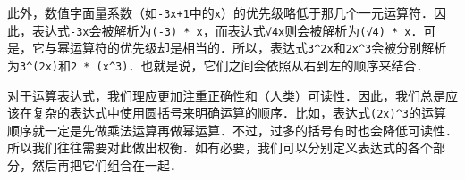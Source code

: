 此外，数值字面量系数（如\verb|-3x+1|中的\verb|x|）的优先级略低于那几个一元运算符．因此，表达式\verb|-3x|会被解析为\verb|(-3) * x|，而表达式\verb|√4x|则会被解析为\verb|(√4) * x|．可是，它与幂运算符的优先级却是相当的．所以，表达式\verb|3^2x|和\verb|2x^3|会被分别解析为\verb|3^(2x)|和\verb|2 * (x^3)|．也就是说，它们之间会依照从右到左的顺序来结合．

对于运算表达式，我们理应更加注重正确性和（人类）可读性．因此，我们总是应该在复杂的表达式中使用圆括号来明确运算的顺序．比如，表达式\verb|(2x)^3|的运算顺序就一定是先做乘法运算再做幂运算．不过，过多的括号有时也会降低可读性．所以我们往往需要对此做出权衡．如有必要，我们可以分别定义表达式的各个部分，然后再把它们组合在一起．
